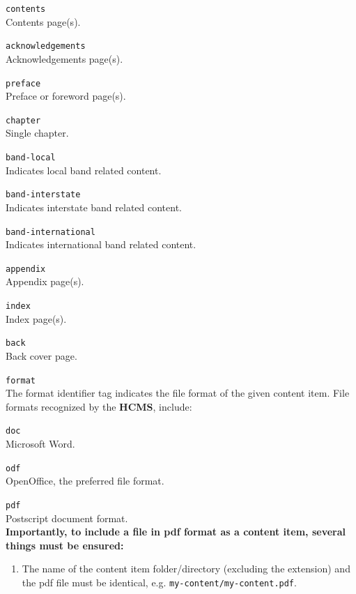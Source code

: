 \documentclass[12pt]{article}
\begin{document}
\begin{description}
\begin{description}
	\item {\tt contents}\\
	Contents page(s).
	\item {\tt acknowledgements}\\
	Acknowledgements page(s).
	\item {\tt preface}\\
	Preface or foreword page(s).
	\item {\tt chapter}\\
	Single chapter.
	\item {\tt band-local}\\
	Indicates local band related content.
	\item {\tt band-interstate}\\
	Indicates interstate band related content.
	\item {\tt band-international}\\
	Indicates international band related content.
	\item {\tt appendix}\\
	Appendix page(s).
	\item {\tt index}\\
	Index page(s).
	\item {\tt back}\\
	Back cover page.
	\end{description}
\item{\tt format}\\
The format identifier tag indicates the file format of the given content item. File formats recognized by the {\bf \small HCMS}, include:
	\begin{description}
	\item {\tt doc}\\
	Microsoft Word.
	\item {\tt odf}\\
	OpenOffice, the preferred file format.
	\item {\tt pdf}\\
	Postscript document format.\\
	{\bf Importantly, to include a file in pdf format as a content item, several things must be ensured:}
		\begin{enumerate}
		\item The name of the content item folder/directory (excluding the extension) and the pdf file must be identical, e.g. {\tt \small my-content/my-content.pdf}.

\end{enumerate}
\end{description}
\end{description}
\end{document}
